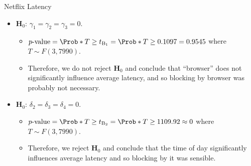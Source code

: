 \begin{Example}{Netflix Latency}{}
\begin{itemize}
\begin{itemize}
              \end{itemize}
        \item $ \mathbf{H}_0 $: $ \gamma_1=\gamma_2=\gamma_3=0 $.
              \begin{itemize}
                  \item $ p\text{-value}=\Prob*{T\ge t_{\text{B}_1}}=\Prob*{T\ge 0.1097}=0.9545 $ where $ T \sim F(3,7990) $.
                  \item Therefore, we do not reject $ \mathbf{H}_0 $ and conclude that ``browser'' does not
                        significantly influence average latency, and so blocking by browser was probably not necessary.
              \end{itemize}
        \item $ \mathbf{H}_0 $: $ \delta_2=\delta_3=\delta_4=0 $.
              \begin{itemize}
                  \item $ p\text{-value}=\Prob*{T\ge t_{\text{B}_2}}=\Prob*{T\ge 1109.92}\approx 0 $ where $ T \sim F(3,7990) $.
                  \item Therefore, we reject $ \mathbf{H}_0 $ and conclude that the time of day significantly influences average latency
                        and so blocking by it was sensible.
              \end{itemize}
    \end{itemize}
\end{Example}

